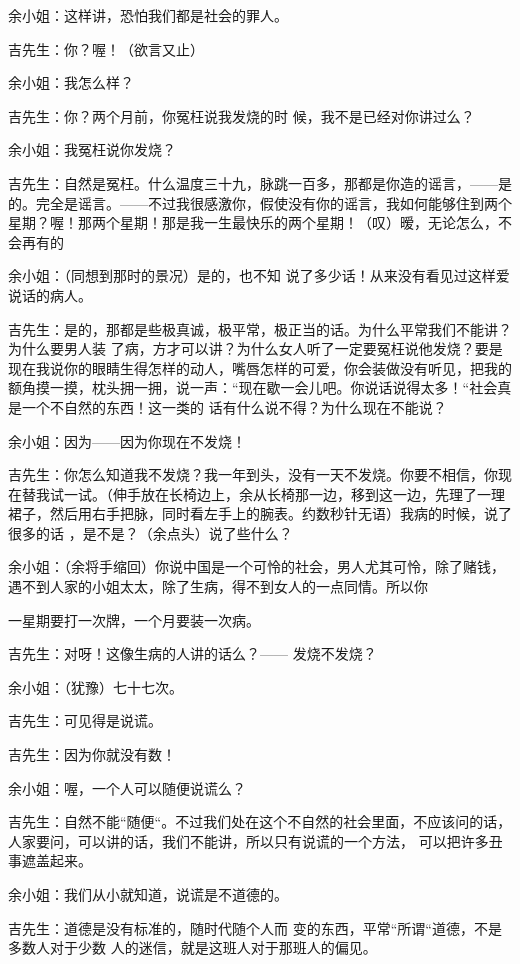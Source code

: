 \documentclass{article}
\begin{document}
余小姐：这样讲，恐怕我们都是社会的罪人。
\newpage



吉先生：你？喔！（欲言又止） 


余小姐：我怎么样？ 

吉先生：你？两个月前，你冤枉说我发烧的时
候，我不是已经对你讲过么？ 


余小姐：我冤枉说你发烧？ 

吉先生：自然是冤枉。什么温度三十九，脉跳一百多，那都是你造的谣言，——是的。完全是谣言。——不过我很感激你，假使没有你的谣言，我如何能够住到两个星期？喔！那两个星期！那是我一生最快乐的两个星期！（叹）暧，无论怎么，不会再有的

余小姐：（同想到那时的景况）是的，也不知
说了多少话！从来没有看见过这样爱说话的病人。 

吉先生：是的，那都是些极真诚，极平常，极正当的话。为什么平常我们不能讲？为什么要男人装
\newpage
了病，方才可以讲？为什么女人听了一定要冤枉说他发烧？要是现在我说你的眼睛生得怎样的动人，嘴唇怎样的可爱，你会装做没有听见，把我的额角摸一摸，枕头拥一拥，说一声：“现在歇一会儿吧。你说话说得太多！“社会真是一个不自然的东西！这一类的
话有什么说不得？为什么现在不能说？ 


余小姐：因为——因为你现在不发烧！ 

吉先生：你怎么知道我不发烧？我一年到头，没有一天不发烧。你要不相信，你现在替我试一试。（伸手放在长椅边上，余从长椅那一边，移到这一边，先理了一理裙子，然后用右手把脉，同时看左手上的腕表。约数秒针无语）我病的时候，说了很多的话
，是不是？（余点头）说了些什么？ 


余小姐：（余将手缩回）你说中国是一个可怜的社会，男人尤其可怜，除了赌钱，遇不到人家的小姐太太，除了生病，得不到女人的一点同情。所以你

\newpage
一星期要打一次牌，一个月要装一次病。 

吉先生：对呀！这像生病的人讲的话么？——
发烧不发烧？ 


余小姐：（犹豫）七十七次。 


吉先生：可见得是说谎。 



吉先生：因为你就没有数！ 


余小姐：喔，一个人可以随便说谎么？ 

吉先生：自然不能“随便“。不过我们处在这个不自然的社会里面，不应该问的话，人家要问，可以讲的话，我们不能讲，所以只有说谎的一个方法，
可以把许多丑事遮盖起来。 

余小姐：我们从小就知道，说谎是不道德的。

吉先生：道德是没有标准的，随时代随个人而
\newpage
变的东西，平常“所谓“道德，不是多数人对于少数
人的迷信，就是这班人对于那班人的偏见。 
\end{document}
